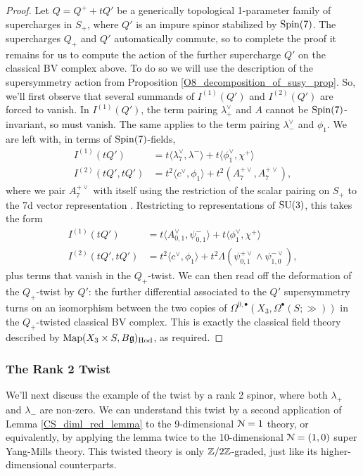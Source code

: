 \documentclass[10pt, oneside]{article}
\begin{document}
\begin{proof}
Let $Q = Q^+ + tQ'$ be a generically topological 1-parameter family of supercharges in $S_+$, where $Q'$ is an impure spinor stabilized by $\mathrm{Spin}(7)$.  The supercharges $Q_+$ and $Q'$ automatically commute, so to complete the proof it remains for us to compute the action of the further supercharge $Q'$ on the classical BV complex above.  To do so we will use the description of the supersymmetry action from Proposition \ref{O8_decomposition_of_susy_prop}.  So, we'll first observe that several summands of $I^{(1)}(Q')$ and $I^{(2)}(Q')$ are forced to vanish.  In $I^{(1)}(Q')$, the term pairing $\lambda_+^\vee$ and $A$ cannot be $\mathrm{Spin}(7)$-invariant, so must vanish.  The same applies to the term pairing $\lambda_-^\vee$ and $\phi_1$. We are left with, in terms of $\mathrm{Spin}(7)$-fields,
\begin{align*}
I^{(1)}(tQ') &= t\langle\lambda_7^\vee, \lambda^-\rangle + t\langle \phi_1^\vee, \chi^+\rangle \\
I^{(2)}(tQ', tQ') &= t^2\langle c^\vee, \phi_1\rangle + t^2 (A_7^{+\vee} , A_7^{+\vee}),
\end{align*}
where we pair $A_7^{+\vee}$ with itself using the restriction of the scalar pairing on $S_+$ to the 7d vector representation .  Restricting to representations of $\mathrm{SU}(3)$, this takes the form
\begin{align*}
I^{(1)}(tQ') &= t\langle A_{0,1}^\vee, \psi_{0,1}^-\rangle + t\langle \phi_1^\vee, \chi^+\rangle \\
I^{(2)}(tQ', tQ') &= t^2\langle c^\vee, \phi_1\rangle + t^2 \Lambda(\psi_{0,1}^{+\vee} \wedge \psi_{1,0}^{-\vee}),
\end{align*}
plus terms that vanish in the $Q_+$-twist.  We can then read off the deformation of the $Q_+$-twist by $Q'$: the further differential associated to the $Q'$ supersymmetry turns on an isomorphism between the two copies of $\Omega^{0,\bullet}(X_3, \Omega^\bullet(S;\gg))$ in the $Q_+$-twisted classical BV complex.  This is exactly the classical field theory described by $\operatorname{Map}(X_3 \times S, B\mathfrak{g})_{\mathrm{Hod}}$, as required.
\end{proof}

\subsubsection{The Rank 2 Twist}
We'll next discuss the example of the twist by a rank 2 spinor, where both $\lambda_+$ and $\lambda_-$ are non-zero.  We can understand this twist by a second application of Lemma \ref{CS_diml_red_lemma} to the 9-dimensional $\mathcal{N}=1$ theory, or equivalently, by applying the lemma twice to the 10-dimensional $\mathcal{N}=(1,0)$ super Yang-Mills theory.  This twisted theory is only $\mathbb Z/2\mathbb Z$-graded, just like its higher-dimensional counterparts.
\end{document}
